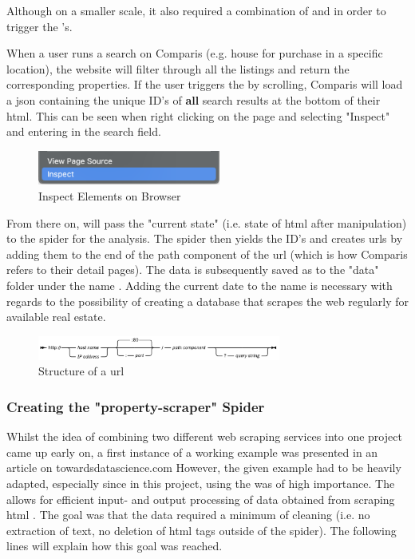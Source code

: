 \documentclass[main]{subfiles}
\begin{document}
Although on a smaller scale, 
it also required a combination of \pkg[Scrapy] and \pkg[Selenium] in order to trigger the \js's.

When a user runs a search on Comparis (e.g. house for purchase in a specific location), 
the website will filter through all the listings and return the corresponding properties.
If the user triggers the \js by scrolling, Comparis will load a \acs*{json} 
containing the unique ID's of \textbf{all} search results at the bottom of their \acs*{html}.
This can be seen when right clicking on the page and selecting "Inspect" and entering  
in the search field.

\begin{figure}[htbp]
    \centerline{
        \includegraphics[width = 60mm]{prog_3.png}}
    \caption{Inspect Elements on Browser}
    \label{fig:inspectelement}
\end{figure}

From there on, \pkg[Selenium] will pass the "current state" (i.e. state of \acs*{html} after \js manipulation)
to the spider for the analysis.
The spider then yields the ID's and creates \acsp*{url} by adding them to the end of the path component of the \acs*{url}
(which is how Comparis refers to their detail pages).
The data is subsequently saved as \pkg[.csv] to the "data" folder under the name .
Adding the current date to the name is necessary with regards to the possibility 
of creating a database that scrapes the web regularly for available real estate.

\begin{figure}[htbp]
    \centerline{
        \includegraphics[width = 80mm]{prog_4.png}}
    \caption{Structure of a \acs*{url} \cite{IBMDocumentation2021}}
    \label{fig:listing}
\end{figure}

\vspace*{5pt}
\subsubsection{Creating the "property-scraper" Spider}
Whilst the idea of combining two different web scraping services into one project came up early on,
a first instance of a working example was presented in an article on towardsdatascience.com\cite{reusovaWebScrapingLess2019}
However, the given example had to be heavily adapted, especially since in this project, 
using the \pkg[ItemLoader] was of high importance.
The \pkg[ItemLoader] allows for efficient input- and output processing of data obtained from scraping \acs*{html} \cite{ScrapyTutorialScrapy}. 
The goal was that the data required a minimum of cleaning (i.e. no extraction of text, no deletion of \acs*{html} tags outside of the spider).
The following lines will explain how this goal was reached.
\end{document}
